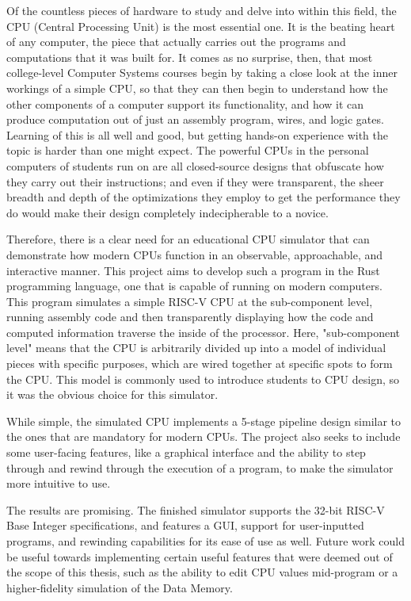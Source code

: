 \documentclass[12pt,twoside]{reedthesis}
\begin{document}
Of the countless pieces of hardware to study and delve into within this field, the CPU (Central Processing Unit) is the most essential one. It is the beating heart of any computer, the piece that actually carries out the programs and computations that it was built for. It comes as no surprise, then, that most college-level Computer Systems courses begin by taking a close look at the inner workings of a simple CPU, so that they can then begin to understand how the other components of a computer support its functionality, and how it can produce computation out of just an assembly program, wires, and logic gates. Learning of this is all well and good, but getting hands-on experience with the topic is harder than one might expect. The powerful CPUs in the personal computers of students run on are all closed-source designs that obfuscate how they carry out their instructions; and even if they were transparent, the sheer breadth and depth of the optimizations they employ to get the performance they do would make their design completely indecipherable to a novice.

Therefore, there is a clear need for an educational CPU simulator that can demonstrate how modern CPUs function in an observable, approachable, and interactive manner. This project aims to develop such a program in the Rust programming language, one that is capable of running on modern computers. This program simulates a simple RISC-V CPU at the sub-component level, running assembly code and then transparently displaying how the code and computed information traverse the inside of the processor.
Here, "sub-component level" means that the CPU is arbitrarily divided up into a model of individual pieces with specific purposes, which are wired together at specific spots to form the CPU. This model is commonly used to introduce students to CPU design, so it was the obvious choice for this simulator.

While simple, the simulated CPU implements a 5-stage pipeline design similar to the ones that are mandatory for modern CPUs. The project also seeks to include some user-facing features, like a graphical interface and the ability to step through and rewind through the execution of a program, to make the simulator more intuitive to use.

The results are promising. The finished simulator supports the 32-bit RISC-V Base Integer specifications, and features a GUI, support for user-inputted programs, and rewinding capabilities for its ease of use as well. Future work could be useful towards implementing certain useful features that were deemed out of the scope of this thesis, such as the ability to edit CPU values mid-program or a higher-fidelity simulation of the Data Memory.
\end{document}
